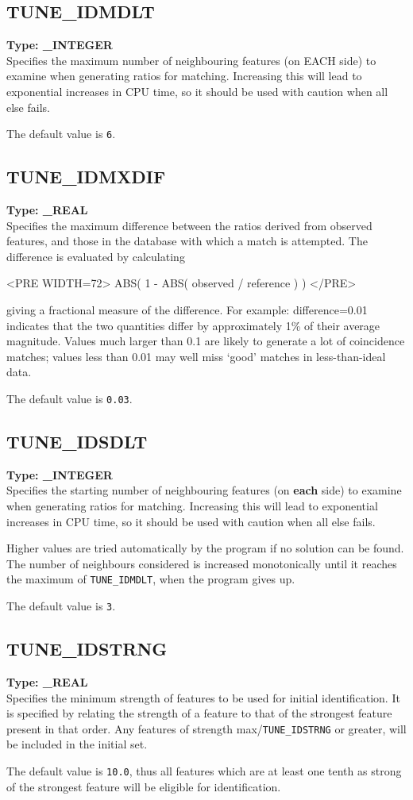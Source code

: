 \documentclass[11pt,twoside]{article}
\makeatletter
\newcommand{\htmlref}[2]{#1}
\newcommand{\xlabel}[1]{}
\newcommand{\sunspec}[2]{#1}
\renewcommand{\sunspec}[2]{#2}
\newcommand{\indexcmdname}[1]{\index{#1@\protect\cmdname{#1}}}
\renewcommand{\indexcmdname}[1]{}
\newcommand{\cmdname}{\begingroup \catcode`\_=12 \realcmdname}
\newcommand{\realcmdname}[1]{\endgroup\texttt{#1}}
\newcommand{\echparameter}[4]
{
\item [#1 = #3] \mbox{}\label{par_#2}\indexcmdname{#2}
\\
#4
}
\renewcommand{\echparameter}[4]
{
  \subsection{\xlabel{par_#2}\label{par_#2}{\bf #1}}
  {\bf Type: #3}\\
#4
}
\makeatother
\begin{document}
\echparameter{TUNE\_IDMDLT}{TUNE_IDMDLT}{
 \_INTEGER
}{
 Specifies the maximum number of neighbouring features (on EACH
 side) to examine when generating ratios for matching.  Increasing
 this will lead to exponential increases in CPU time, so it should
 be used with caution when all else fails.

 The default value is \texttt{6}.
}

\echparameter{TUNE\_IDMXDIF}{TUNE_IDMXDIF}{
 \_REAL
}{
 Specifies the maximum difference between the ratios derived from
 observed features, and those in the database with which a match is
 attempted.  The difference is evaluated by calculating
\sunspec{
  \[ {\rm ABS( 1 - ABS( observed / reference ))} \]
}{
\begin{rawhtml}
<PRE WIDTH=72>
   ABS( 1 - ABS( observed / reference ) )
</PRE>
\end{rawhtml}
}
 giving a fractional measure of the difference.  For example:
 difference=0.01 indicates that the two quantities differ by
 approximately 1\% of their average magnitude.  Values much larger
 than 0.1 are likely to generate a lot of coincidence matches;
 values less than 0.01 may well miss `good' matches in
 less-than-ideal data.

 The default value is \texttt{0.03}.
}

\echparameter{TUNE\_IDSDLT}{TUNE_IDSDLT}{
 \_INTEGER
}{
 Specifies the starting number of neighbouring features (on {\bf each}
 side) to examine when generating ratios for matching.  Increasing
 this will lead to exponential increases in CPU time, so it should
 be used with caution when all else fails.

 Higher values are tried automatically by the program if no solution
 can be found.  The number of neighbours considered is increased
 monotonically until it reaches the maximum of
 \htmlref{{\tt TUNE\_IDMDLT}}{par_TUNE_IDMULT}, when the
 program gives up.

 The default value is \texttt{3}.
}

\echparameter{TUNE\_IDSTRNG}{TUNE_IDSTRNG}{
 \_REAL
}{
 Specifies the minimum strength of features to be used for initial
 identification.  It is specified by relating the strength of a
 feature to that of the strongest feature present in that order.
 Any features of strength max/{\tt{TUNE\_IDSTRNG}} or greater, will be
 included in the initial set.

 The default value is \texttt{10.0}, thus all features which are at least one
 tenth as strong of the strongest feature will be eligible for
 identification.
}
\end{document}
